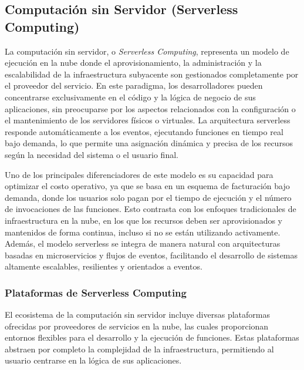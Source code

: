 {        \subsection{Computación sin Servidor (Serverless Computing)}
            La computación sin servidor, o \textit{Serverless Computing}, representa un modelo de ejecución en la nube donde el aprovisionamiento, la administración y la escalabilidad de la infraestructura subyacente son gestionados completamente por el proveedor del servicio. En este paradigma, los desarrolladores pueden concentrarse exclusivamente en el código y la lógica de negocio de sus aplicaciones, sin preocuparse por los aspectos relacionados con la configuración o el mantenimiento de los servidores físicos o virtuales. La arquitectura serverless responde automáticamente a los eventos, ejecutando funciones en tiempo real bajo demanda, lo que permite una asignación dinámica y precisa de los recursos según la necesidad del sistema o el usuario final.
            
            Uno de los principales diferenciadores de este modelo es su capacidad para optimizar el costo operativo, ya que se basa en un esquema de facturación bajo demanda, donde los usuarios solo pagan por el tiempo de ejecución y el número de invocaciones de las funciones. Esto contrasta con los enfoques tradicionales de infraestructura en la nube, en los que los recursos deben ser aprovisionados y mantenidos de forma continua, incluso si no se están utilizando activamente. Además, el modelo serverless se integra de manera natural con arquitecturas basadas en microservicios y flujos de eventos, facilitando el desarrollo de sistemas altamente escalables, resilientes y orientados a eventos.
            
            \subsubsection{Plataformas de Serverless Computing}
                El ecosistema de la computación sin servidor incluye diversas plataformas ofrecidas por proveedores de servicios en la nube, las cuales proporcionan entornos flexibles para el desarrollo y la ejecución de funciones. Estas plataformas abstraen por completo la complejidad de la infraestructura, permitiendo al usuario centrarse en la lógica de sus aplicaciones.
                
}
